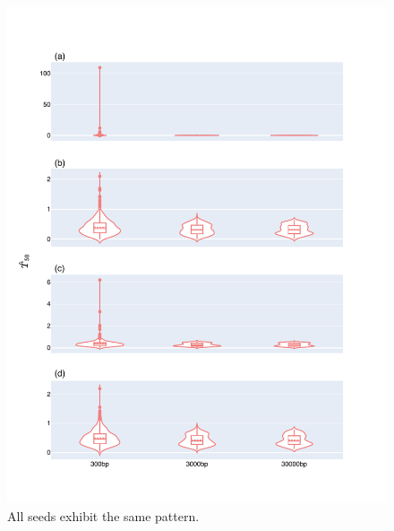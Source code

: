 \begin{figure}[!ht]
\centering
\includegraphics[width=\textwidth]{figures/plots/synthetic/T50/all_seeds.pdf}
\caption{All seeds exhibit the same pattern.}
\label{fig:synthetic/T50/all-seeds}
\end{figure}